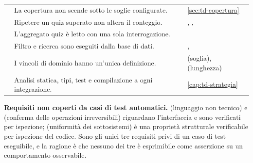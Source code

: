 \begin{longtable}{@{}l L{6.8cm} L{4.8cm}@{}}
 &
La copertura non scende sotto le soglie configurate. &
\cref{sec:td-copertura} \\

 &
Ripetere un quiz superato non altera il conteggio. &
, ,  \\
\midrule

 &
L'aggregato quiz è letto con una sola interrogazione. &
 \\

 &
Filtro e ricerca sono eseguiti dalla base di dati. &
,  \\
\midrule

 &
I vincoli di dominio hanno un'unica definizione. &
 (soglia),  (lunghezza) \\

 &
Analisi statica, tipi, test e compilazione a ogni integrazione. &
\cref{cap:td-strategia} \\

\end{longtable}

\begin{nota}
\textbf{Requisiti non coperti da casi di test automatici.} 
(linguaggio non tecnico) e  (conferma delle operazioni
irreversibili) riguardano l'interfaccia e sono verificati per ispezione;
 (uniformità dei sottosistemi) è una proprietà strutturale
verificabile per ispezione del codice. Sono gli unici tre requisiti privi di
un caso di test eseguibile, e la ragione è che nessuno dei tre è esprimibile
come asserzione su un comportamento osservabile.
\end{nota}
